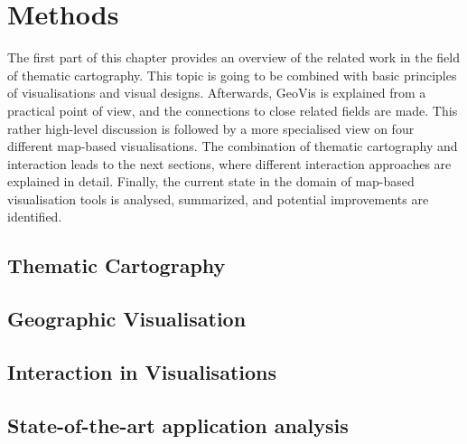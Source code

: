 \section{Methods}
The first part of this chapter provides an overview of the related work in the field of
thematic cartography. This topic is going to be combined with basic principles of visualisations and visual designs. Afterwards, \ac{GeoVis} is explained from a practical point of view, and the connections to close related fields are made. This rather high-level discussion is followed by a more specialised view on four different map-based visualisations. The combination of thematic cartography and interaction leads to the next sections, where different interaction approaches are explained in detail. Finally, the current state in the domain of map-based visualisation tools is analysed, summarized, and potential improvements are identified.

\subsection{Thematic Cartography}
\label{s:cartography}


\subsection{Geographic Visualisation}
\label{s:geovis-practical}


\subsection{Interaction in Visualisations}
\label{s:interaction}


\subsection{State-of-the-art application analysis}
